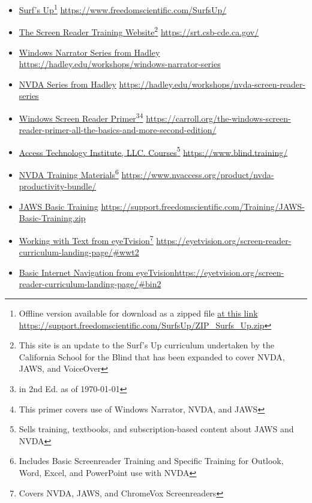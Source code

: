 \begin{itemize}[leftmargin=*]
\item \href{https://www.freedomscientific.com/SurfsUp/}{Surf's Up}\footnote{\raggedright Offline version available for download as a zipped file \href{https://support.freedomscientific.com/SurfsUp/ZIP_Surfs_Up.zip}{at this link} \break\url{https://support.freedomscientific.com/SurfsUp/ZIP_Surfs_Up.zip}} \break\url{https://www.freedomscientific.com/SurfsUp/}
\item \href{https://srt.csb-cde.ca.gov/}{The Screen Reader Training Website}\footnote{\raggedright This site is an update to the Surf's Up curriculum undertaken by the California School for the Blind that has been expanded to cover NVDA, JAWS, and VoiceOver} \break\url{https://srt.csb-cde.ca.gov/}
\item \href{https://hadley.edu/workshops/windows-narrator-series}{Windows Narrator Series from Hadley} \break\url{https://hadley.edu/workshops/windows-narrator-series}
\item \href{https://hadley.edu/workshops/nvda-screen-reader-series}{NVDA Series from Hadley} \break\url{https://hadley.edu/workshops/nvda-screen-reader-series}
\item \href{https://carroll.org/the-windows-screen-reader-primer-all-the-basics-and-more-second-edition/}{Windows Screen Reader Primer}\footnote{\raggedright in 2nd Ed. as of \today}\fnsep\footnote{\raggedright This primer covers use of Windows Narrator, NVDA, and JAWS} \break\url{https://carroll.org/the-windows-screen-reader-primer-all-the-basics-and-more-second-edition/}
\item \href{https://www.blind.training/}{Access Technology Institute, LLC. Courses}\footnote{\raggedright Sells training, textbooks, and subscription-based content about JAWS and NVDA} \break\url{https://www.blind.training/}
\item \href{https://www.nvaccess.org/product/nvda-productivity-bundle/}{NVDA Training Materials}\footnote{\raggedright Includes Basic Screenreader Training and Specific Training for Outlook, Word, Excel, and PowerPoint use with NVDA} \break\url{https://www.nvaccess.org/product/nvda-productivity-bundle/}
\item \href{https://support.freedomscientific.com/Training/JAWS-Basic-Training.zip}{JAWS Basic Training} \break\url{https://support.freedomscientific.com/Training/JAWS-Basic-Training.zip}
\item \href{https://eyetvision.org/screen-reader-curriculum-landing-page/#wwt2}{Working with Text  from eyeTvision}\footnote{\raggedright Covers NVDA, JAWS, and ChromeVox Screenreaders} \url{https://eyetvision.org/screen-reader-curriculum-landing-page/#wwt2}
\item \href{https://eyetvision.org/screen-reader-curriculum-landing-page/#bin2}{Basic Internet Navigation from eyeTvision}\footnotemark[\value{footnote}] \break\url{https://eyetvision.org/screen-reader-curriculum-landing-page/#bin2}
\end{itemize}

